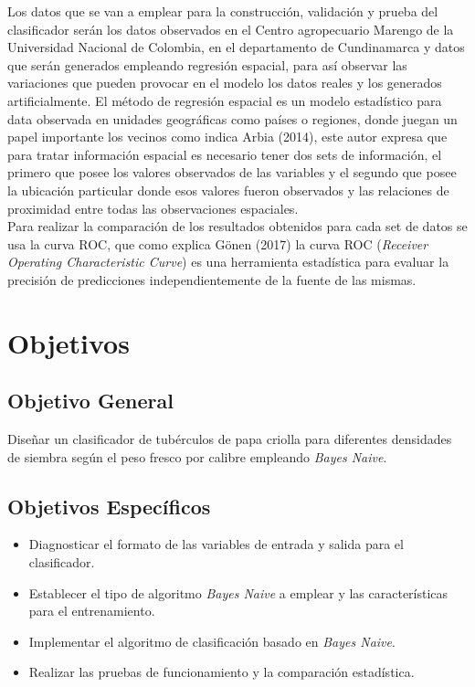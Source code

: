 Los datos que se van a emplear para la construcción, validación y prueba del clasificador serán los datos observados en el Centro agropecuario Marengo de la Universidad Nacional de Colombia, en el departamento de Cundinamarca y datos que serán generados empleando regresión espacial, para así observar las variaciones que pueden provocar en el modelo los datos reales y los generados artificialmente. El método de regresión espacial es un modelo estadístico para data observada en unidades geográficas como países o regiones, donde juegan un papel importante los vecinos como indica Arbia (2014), este autor expresa que para tratar información espacial es necesario tener dos sets de información, el primero que posee los valores observados de las variables y el segundo que posee la ubicación particular donde esos valores fueron observados y las relaciones de proximidad entre todas las observaciones espaciales.\\

Para realizar la comparación de los resultados obtenidos para cada set de datos se usa la curva ROC, que como explica Gönen (2017) la curva ROC (\textit{Receiver Operating Characteristic Curve}) es una herramienta estadística para evaluar la precisión de predicciones independientemente de la fuente de las mismas.

\section{Objetivos}

\subsection{Objetivo General}

Diseñar un clasificador de tubérculos de papa criolla para diferentes densidades de siembra según el peso fresco por calibre empleando \textit{Bayes Naive}.

\subsection{Objetivos Espec\'ificos}

\begin{itemize}
\item  Diagnosticar el formato de las variables de entrada y salida para el clasificador.
\item	 Establecer el tipo de algoritmo \textit{Bayes Naive} a emplear  y las características para el entrenamiento.
\item  Implementar el algoritmo de clasificación basado en \textit{Bayes Naive}.
\item  Realizar las pruebas de funcionamiento y la comparación estadística.
\end{itemize}

